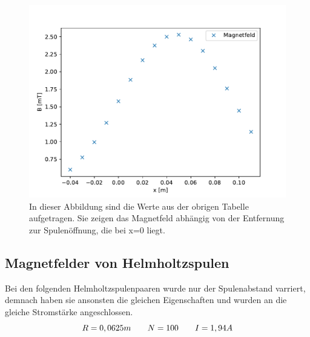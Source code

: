 \documentclass[titlepage = firstcover]{scrartcl}
\begin{document}
            \begin{figure}[h]
                \centering
                \includegraphics{Spulekurz.pdf}
                \caption{In dieser Abbildung sind die Werte aus der obrigen Tabelle aufgetragen. Sie zeigen das Magnetfeld abhängig von der Entfernung zur Spulenöffnung, die bei x=0 liegt.}
                \label{fig:Spulekurz}

            \end{figure}

            \FloatBarrier
            \newpage


    \subsection{Magnetfelder von Helmholtzspulen}
            Bei den folgenden Helmholtzspulenpaaren wurde nur der Spulenabstand varriert, demnach haben sie ansonsten die gleichen Eigenschaften und wurden an
            die gleiche Stromstärke angeschlossen.
            \begin{equation*}
                R = 0,0625m \qquad N = 100 \qquad I = 1,94A \\
            \end{equation*}
\end{document}
